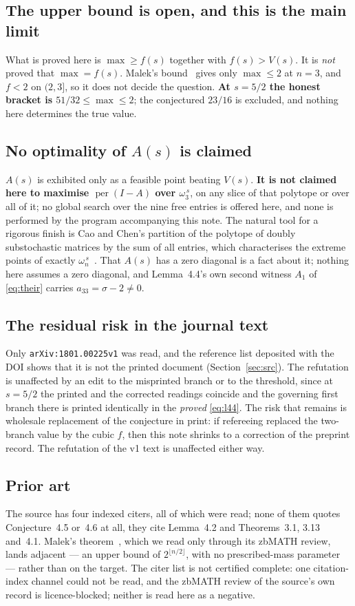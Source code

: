 \documentclass[11pt]{amsart}
\theoremstyle{remark}
\DeclareMathOperator{\per}{per}
\newcommand{\ws}{\omega}
\begin{document}
\subsection*{The upper bound is open, and this is the main limit}
What is proved here is $\max\ge f(s)$ together with $f(s)>V(s)$. It is \emph{not}
proved that $\max=f(s)$. Malek's bound~\cite{malek} gives only $\max\le2$ at $n=3$,
and $f<2$ on $(2,3]$, so it does not decide the question. \textbf{At $s=5/2$ the
honest bracket is $51/32\le\max\le2$}; the conjectured $23/16$ is excluded, and
nothing here determines the true value.

\subsection*{No optimality of $A(s)$ is claimed}
$A(s)$ is exhibited only as a feasible point beating $V(s)$. \textbf{It is not claimed
here to maximise $\per(I-A)$ over $\ws_3^{\,s}$}, on any slice of that polytope or
over all of it; no global search over the nine free entries is offered here, and none
is performed by the program accompanying this note. The natural tool for a rigorous
finish is Cao and Chen's partition of the polytope of doubly substochastic matrices by
the sum of all entries, which characterises the extreme points of exactly
$\ws_n^{\,s}$~\cite{caochen}. That $A(s)$ has a zero diagonal is a fact about it;
nothing here assumes a zero diagonal, and Lemma~4.4's own second witness $A_1$ of
\eqref{eq:their} carries $a_{33}=\sigma-2\ne0$.

\subsection*{The residual risk in the journal text}
Only \texttt{arXiv:1801.00225v1} was read, and the reference list deposited with the
DOI shows that it is not the printed document (Section~\ref{sec:src}). The refutation
is unaffected by an edit to the misprinted branch or to the
threshold, since at $s=5/2$ the printed and the corrected readings coincide and the
governing first branch there is printed identically in the \emph{proved}
\eqref{eq:l44}. The risk that remains is wholesale replacement of the conjecture in
print: if refereeing replaced the two-branch value by the cubic $f$, then this note
shrinks to a correction of the preprint record. The refutation of the v1 text is
unaffected either way.

\subsection*{Prior art}
The source has four indexed citers, all of which were read; none of them quotes
Conjecture~4.5 or~4.6 at all, they cite Lemma~4.2 and Theorems~3.1, 3.13 and~4.1.
Malek's theorem~\cite{malek}, which we read only through its zbMATH review, lands
adjacent --- an upper bound of $2^{\lfloor n/2\rfloor}$, with no prescribed-mass
parameter --- rather than on the target. The citer list is not certified complete: one
citation-index channel could not be read, and the zbMATH review of the source's own
record is licence-blocked; neither is read here as a negative.
\end{document}
